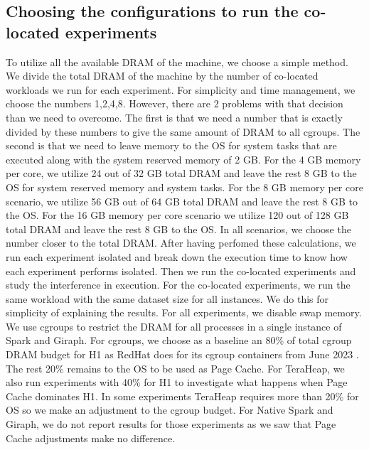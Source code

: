 \subsection{Choosing the configurations to run the co-located experiments}
To utilize all the available DRAM of the machine, we choose a simple method. 
We divide the total DRAM of the machine by the number of co-located workloads we run for each experiment.
For simplicity and time management, we choose the numbers 1,2,4,8. However, there are 2 problems with that decision
than we need to overcome. The first is that we need a number that is exactly divided by these numbers to give the same amount of DRAM to
all cgroups. The second is that we need to leave memory to the OS for system tasks that are executed along with the system reserved memory of 2 GB. For the 4 GB memory per core, we utilize 24 out of 32 GB total DRAM and leave the rest 8 GB to the OS for system reserved memory and system tasks. For the 8 GB memory per core scenario, we utilize 56 GB out of 64 GB total DRAM and leave the rest 8 GB to the OS. For the 16 GB memory per core scenario we utilize 120 out of 128 GB total DRAM and leave the rest 8 GB to the OS. 
In all scenarios, we choose the number closer to the total DRAM. After having perfomed these calculations, we run each experiment isolated and break down the execution time to know how each experiment performs isolated. Then we run the co-located experiments and study the interference in execution. For the co-located experiments, we run the same workload with the same dataset size for all instances. We do this for simplicity of explaining the results. For all experiments, we disable swap memory.
We use cgroups \cite{cgroups} to restrict the DRAM for all processes in a single instance of Spark and Giraph.
For cgroups, we choose as a baseline an 80\% of total cgroup DRAM budget for H1 as RedHat does for its cgroup containers from June 2023 \cite{redhatblog}.
The rest 20\% remains to the OS to be used as Page Cache.
For TeraHeap, we also run experiments with 40\% for H1 to investigate what happens when Page Cache dominates H1.
In some experiments TeraHeap requires more than 20\% for OS so we make an adjustment to the cgroup budget.
For Native Spark and Giraph, we do not report results for those experiments as we saw that Page Cache adjustments make no difference.


